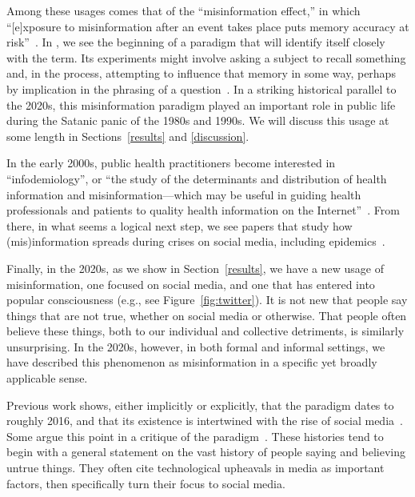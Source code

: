\documentclass[          
 pre,
 twocolumn,
 twoside,
 superscriptaddress,
 amsmath,
 amssymb,                
 apsf
]{revtex4-2}
\begin{document}
Among these usages comes that of the ``misinformation effect,'' in which ``[e]xposure to misinformation after an event takes place puts memory accuracy at risk''~\cite{loftus_misinformation_2024}. In \citet{loftus_reconstruction_1974}, we see the beginning of a paradigm that will identify itself closely with the term. Its experiments might involve asking a subject to recall something and, in the process, attempting to influence that memory in some way, perhaps by implication in the phrasing of a 
question~\cite{loftusPlantingMisinformationHuman2005b}. In a striking historical parallel to the 2020s, this misinformation paradigm played an important role in public life during the Satanic panic of the 1980s and 1990s. We will discuss this usage at some length in Sections~\ref{results} and \ref{discussion}. 

In the early 2000s, public health practitioners become interested in ``infodemiology'', or ``the study of the determinants and distribution of health information and misinformation—which may be useful in guiding health professionals and patients to quality health information on the Internet''~\cite{eysenbachInfodemiologyEpidemiologyMisinformation2002}. From there, in what seems a logical next step, we see papers that study how (mis)information spreads during crises on social media, including epidemics~\cite{suttonBackchannelsFrontLines2008, chewPandemicsAgeTwitter2010, ohEXPLORATIONSOCIALMEDIA2010}. 

Finally, in the 2020s, as we show in Section~\ref{results}, we have a new usage of misinformation, one focused on social media, and one that has entered into popular consciousness (e.g., see Figure~\ref{fig:twitter}). It is not new that people say things that are not true, whether on social media or otherwise. That people often believe these things, both to our individual and collective detriments, is similarly unsurprising. In the 2020s, however, in both formal and informal settings, we have described this phenomenon as misinformation in a specific yet broadly applicable sense. 

Previous work shows, either implicitly or explicitly, that the paradigm dates to roughly 2016, and that its existence is intertwined with the rise of social media~\cite{broda_misinformation_2024,donovan_express_2025}. Some argue this point in a critique of the paradigm~\cite{miro-llinares_misinformation_2023}. These histories tend to begin with a general statement on the vast history of people saying and believing untrue things. They often cite technological upheavals in media as important factors, then specifically turn their focus to social media. 
\end{document}
